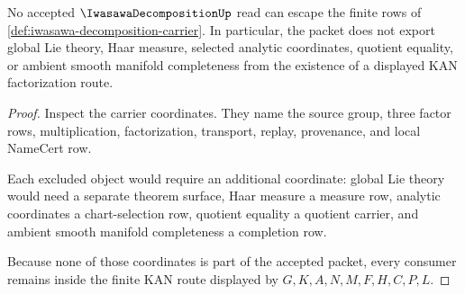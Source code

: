 \begin{theorem}
\label{thm:iwasawa-decomposition-nonescape}
No accepted $\IwasawaDecompositionUp$ read can escape the finite rows of \autoref{def:iwasawa-decomposition-carrier}. In particular, the packet does not export global Lie theory, Haar measure, selected analytic coordinates, quotient equality, or ambient smooth manifold completeness from the existence of a displayed KAN factorization route.
\end{theorem}
\begin{proof}
Inspect the carrier coordinates. They name the source group, three factor rows, multiplication, factorization, transport, replay, provenance, and local NameCert row.

Each excluded object would require an additional coordinate: global Lie theory would need a separate theorem surface, Haar measure a measure row, analytic coordinates a chart-selection row, quotient equality a quotient carrier, and ambient smooth manifold completeness a completion row.

Because none of those coordinates is part of the accepted packet, every consumer remains inside the finite KAN route displayed by $G,K,A,N,M,F,H,C,P,L$.
\end{proof}




